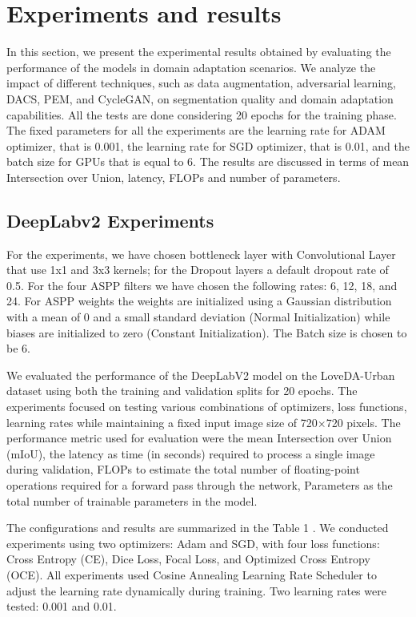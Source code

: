 \documentclass[10pt,twocolumn,letterpaper]{article}
\begin{document}
\noindent


\section{Experiments and results}
\label{sec:experiments}

In this section, we present the experimental results obtained by evaluating the performance of the models in domain adaptation scenarios. We analyze the impact of different techniques, such as data augmentation, adversarial learning, DACS, PEM, and CycleGAN, on segmentation quality and domain adaptation capabilities. All the tests are done considering 20 epochs for the training phase. The fixed parameters for all the experiments are the learning rate for ADAM optimizer, that is 0.001, the learning rate for SGD optimizer, that is 0.01, and the batch size for GPUs that is equal to 6.  The results are discussed in terms of mean Intersection over Union, latency, FLOPs and number of parameters. 

\subsection{DeepLabv2 Experiments}
For the experiments, we have chosen bottleneck layer with Convolutional Layer that use 1x1 and 3x3 kernels; for the Dropout layers a default dropout rate of 0.5. For the four ASPP filters we have chosen the following rates: 6, 12, 18, and 24. For ASPP weights the weights are initialized using a Gaussian distribution with a mean of 0 and a small standard deviation (Normal Initialization) while biases are initialized to zero (Constant Initialization). The Batch size is chosen to be 6.

We evaluated the performance of the DeepLabV2 model on the LoveDA-Urban dataset using both the training and validation splits for 20 epochs. The experiments focused on testing various combinations of optimizers, loss functions, learning rates while maintaining a fixed input image size of 720×720 pixels. The performance metric used for evaluation were the mean Intersection over Union (mIoU), the latency as time (in seconds) required to process a single image during validation, FLOPs to estimate the total number of floating-point operations required for a forward pass through the network, Parameters as the total number of trainable parameters in the model.

The configurations and results are summarized in the Table 1 . We conducted experiments using two optimizers: Adam and SGD, with four loss functions: Cross Entropy (CE), Dice Loss, Focal Loss, and Optimized Cross Entropy (OCE). All experiments used Cosine Annealing Learning Rate Scheduler to adjust the learning rate dynamically during training. Two learning rates were tested: 0.001 and 0.01.
\end{document}
